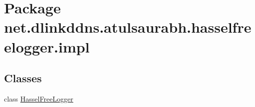 \hypertarget{namespacenet_1_1dlinkddns_1_1atulsaurabh_1_1hasselfreelogger_1_1impl}{}\section{Package net.\+dlinkddns.\+atulsaurabh.\+hasselfreelogger.\+impl}
\label{namespacenet_1_1dlinkddns_1_1atulsaurabh_1_1hasselfreelogger_1_1impl}
\subsection*{Classes}
\begin{DoxyCompactItemize}
\item 
class \mbox{\hyperlink{classnet_1_1dlinkddns_1_1atulsaurabh_1_1hasselfreelogger_1_1impl_1_1_hassel_free_logger}{Hassel\+Free\+Logger}}
\end{DoxyCompactItemize}
